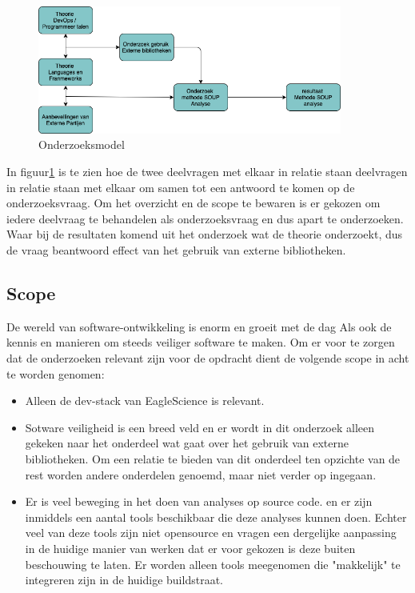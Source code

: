 \begin{figure}[H]
    \myfloatalign
    \includegraphics[width=10cm]{gfx/Onderzoekmodel}
    \caption{Onderzoeksmodel}
    \label{fig:OnderzoeksModel}
\end{figure}

In figuur\ref{fig:OnderzoeksModel} is te zien hoe de twee deelvragen met elkaar in relatie staan deelvragen in relatie staan met elkaar om samen tot een antwoord te komen op de onderzoeksvraag. Om het overzicht en de scope te bewaren is er gekozen om iedere deelvraag te behandelen als onderzoeksvraag en dus apart te onderzoeken. Waar bij de resultaten komend uit het onderzoek wat de theorie onderzoekt, dus de vraag beantwoord effect van het gebruik van externe bibliotheken.

\subsection{Scope}\label{subsec:scope}
De wereld van software-ontwikkeling is enorm en groeit met de dag Als ook de kennis en manieren om steeds veiliger software te maken. Om er voor te zorgen dat de onderzoeken relevant zijn voor de opdracht dient de volgende scope in acht te worden genomen:
\begin{itemize}
    \item Alleen de dev-stack van EagleScience is relevant.
    \item Sotware veiligheid is een breed veld en er wordt in dit onderzoek alleen gekeken naar het onderdeel wat gaat over het gebruik van externe bibliotheken. Om een relatie te bieden van dit onderdeel ten opzichte van de rest worden andere onderdelen genoemd, maar niet verder op ingegaan.
    \item Er is veel beweging in het doen van analyses op source code. en er zijn inmiddels een aantal tools beschikbaar die deze analyses kunnen doen. Echter veel van deze tools zijn niet opensource en vragen een dergelijke aanpassing in de huidige manier van werken dat er voor gekozen is deze buiten beschouwing te laten. Er worden alleen tools meegenomen die "makkelijk" te integreren zijn in de huidige buildstraat.
\end{itemize}

